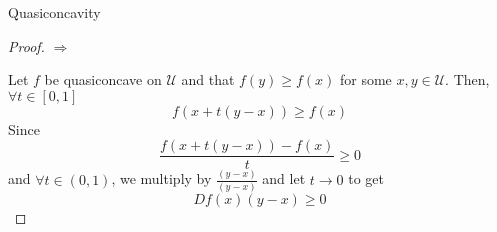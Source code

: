 \documentclass[aspectratio=169]{beamer}
\begin{document}
\begin{frame}{Quasiconcavity}
    \begin{proof}
        $\Rightarrow$

        Let $f$ be quasiconcave on $\mathcal{U}$ and that $f(y)\geq f(x)$ for some $x,y\in\mathcal{U}$. Then, $\forall t\in[0,1]$ \[f(x+t(y-x))\geq f(x)\]
        Since \[\frac{f(x+t(y-x))-f(x)}{t}\geq 0\] and $\forall t\in(0,1)$, we multiply by \(\frac{(y-x)}{(y-x)}\) and let $t\rightarrow 0$ to get \[Df(x)(y-x)\geq 0\]
    \end{proof}
    
\end{frame}
\end{document}
